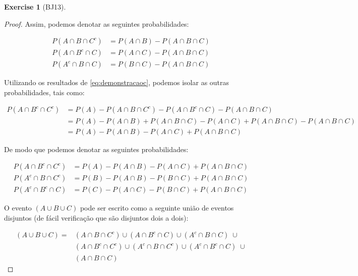 \documentclass[
]{article}
\theoremstyle{definition}
\theoremstyle{definition}
\theoremstyle{definition}
\newtheorem{exercise}{Exercise}[section]
\theoremstyle{definition}
\theoremstyle{remark}
\begin{document}
\begin{exercise}[BJ13]
\begin{proof}
Assim, podemos denotar as seguintes probabilidades:

\begin{equation}
\begin{split}
P(A \cap B \cap C^{c}) &= P(A \cap B) - P(A \cap B \cap C) \\
P(A \cap B^{c} \cap C) &= P(A \cap C) - P(A \cap B \cap C) \\
P(A^{c} \cap B \cap C) &= P(B \cap C) - P(A \cap B \cap C)
\label{eq:demonstracaoc}
\end{split}
\end{equation}

Utilizando os resultados de \eqref{eq:demonstracaoc}, podemos isolar as outras probabilidades, tais como:

\begin{align*}
P(A \cap B^{c} \cap C^{c}) &= P(A) - P(A \cap B \cap C^{c}) - P(A \cap B^{c} \cap C) - P(A \cap B \cap C) \\
&= P(A) - P(A \cap B) + P(A \cap B \cap C) - P(A \cap C) + P(A \cap B \cap C) - P(A \cap B \cap C) \\
&= P(A) - P(A \cap B) - P(A \cap C) + P(A \cap B \cap C)
\end{align*}

De modo que podemos denotar as seguintes probabilidades:

\begin{equation}
\begin{split}
P(A \cap B^{c} \cap C^{c}) &= P(A) - P(A \cap B) - P(A \cap C) + P(A \cap B \cap C) \\
P(A^{c} \cap B \cap C^{c}) &= P(B) - P(A \cap B) - P(B \cap C) + P(A \cap B \cap C) \\
P(A^{c} \cap B^{c} \cap C) &= P(C) - P(A \cap C) - P(B \cap C) + P(A \cap B \cap C)
\label{eq:demonstracaod}
\end{split}
\end{equation}

O evento \((A \cup B \cup C)\) pode ser escrito como a seguinte união de eventos disjuntos (de fácil verificação que são disjuntos dois a dois):

\begin{equation}
\begin{split}
(A \cup B \cup C) = &(A \cap B \cap C^{c}) \cup (A \cap B^{c} \cap C) \cup (A^{c} \cap B \cap C) \; \cup \\
&(A \cap B^{c} \cap C^{c}) \cup (A^{c} \cap B \cap C^{c}) \cup (A^{c} \cap B^{c} \cap C) \; \cup \\
&(A \cap B \cap C)
\label{eq:eqfinala}
\end{split}
\end{equation}


\end{proof}
\end{exercise}
\end{document}
